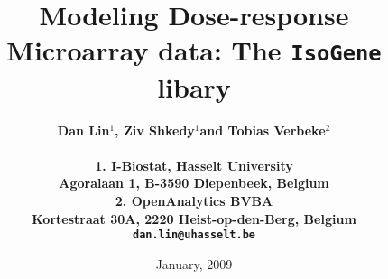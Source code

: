 \title{
{\LARGE \bf
Modeling Dose-response Microarray data: The \texttt{IsoGene} libary\\[2cm]}}
\author{\large \bf Dan Lin$^1$, Ziv Shkedy$^1$and Tobias Verbeke$^2$  \\[2cm]\\
1. I-Biostat, Hasselt University\\
Agoralaan 1, B-3590 Diepenbeek, Belgium\\
2. OpenAnalytics BVBA\\
Kortestraat 30A, 2220 Heist-op-den-Berg, Belgium\\[2cm]
\texttt{dan.lin@uhasselt.be}\\[2cm]
}



\date{January, 2009}
\maketitle
\clearpage\thispagestyle{empty}
\mbox{} 